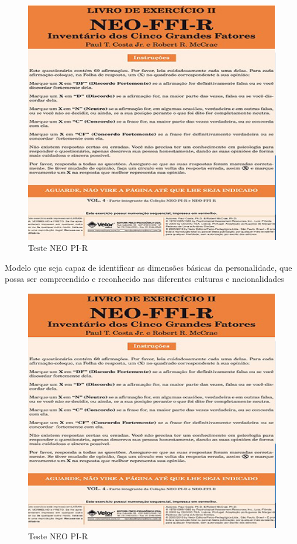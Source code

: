 \documentclass[
]{book}
\begin{document}
\begin{figure}

{\centering \includegraphics[width=0.8\linewidth]{imagens/teste-neo-pi-r} 

}

\caption{Teste NEO PI-R}\label{fig:unnamed-chunk-11}
\end{figure}

Modelo que seja capaz de identificar as dimensões básicas da personalidade, que possa ser compreendido e reconhecido nas diferentes culturas e nacionalidades

\begin{figure}

{\centering \includegraphics[width=0.8\linewidth]{imagens/teste-neo-pi-r} 

}

\caption{Teste NEO PI-R}\label{fig:unnamed-chunk-12}
\end{figure}
\end{document}
